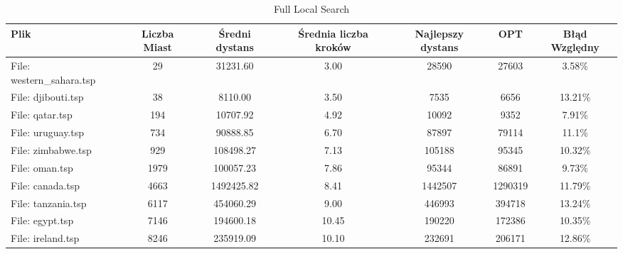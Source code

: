 \begin{table}[H]
    \centering
    \caption{Full Local Search}
    \begin{tabular}{lcccccc}
        \toprule
        Plik & Liczba Miast & Średni dystans & Średnia liczba kroków & Najlepszy dystans & OPT & Błąd Względny \\
        \midrule
        File: western\_sahara.tsp & 29   & 31231.60  & 3.00     & 28590      & 27603 & 3.58\% \\
        File: djibouti.tsp   & 38   & 8110.00   & 3.50     & 7535       & 6656 & 13.21\% \\
        File: qatar.tsp      & 194  & 10707.92  & 4.92     & 10092      & 9352 & 7.91\% \\
        File: uruguay.tsp    & 734  & 90888.85  & 6.70     & 87897      & 79114 & 11.1\% \\
        File: zimbabwe.tsp   & 929  & 108498.27 & 7.13     & 105188     & 95345 & 10.32\% \\
        File: oman.tsp       & 1979 & 100057.23 & 7.86     & 95344      & 86891 & 9.73\% \\
        File: canada.tsp     & 4663 & 1492425.82 & 8.41     & 1442507    & 1290319 & 11.79\% \\
        File: tanzania.tsp   & 6117 & 454060.29 & 9.00     & 446993     & 394718 & 13.24\% \\
        File: egypt.tsp      & 7146 & 194600.18 & 10.45    & 190220     & 172386 & 10.35\% \\
        File: ireland.tsp    & 8246 & 235919.09 & 10.10    & 232691     & 206171 & 12.86\% \\
        \bottomrule
    \end{tabular}
\end{table}
